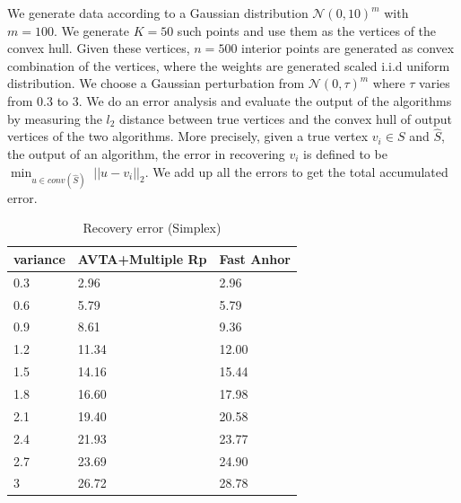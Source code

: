 \documentclass[]{article}
\begin{document}
	\noindent
	 We generate data according to a Gaussian distribution $\mathcal{N}(0,10) ^m$ with $m=100$. We generate $K=50$ such points and use them as the vertices of the convex hull. Given these vertices, $n=500$ interior points are generated as convex combination of the vertices, where the weights are generated  scaled i.i.d uniform distribution. We choose a Gaussian perturbation from $\mathcal{N}(0,\tau) ^m$ where $\tau$ varies from $0.3$ to $3$. 
	We  do an error analysis and evaluate the output of the algorithms by measuring the $l_2$ distance between true vertices and the convex hull of output vertices of the two algorithms.  More precisely, given a true vertex $v_i \in S$ and $\hat{S}$, the output of an algorithm, the error in recovering $v_i$ is defined to be $\min_{u\in conv(\hat{S})} \; ||u-v_i||_2.$ We add up all the errors to get the total accumulated error.
	\begin{table}[!h]
		\centering
		\caption{Recovery error (Simplex)}
		\label{tb:avta rec}
		\begin{tabular}{|l|l|l|}
			\hline
			variance & AVTA+Multiple Rp & Fast Anhor \\ \hline
			0.3      & 2.96             & 2.96       \\ \hline
			0.6      & 5.79             & 5.79       \\ \hline
			0.9      & 8.61             & 9.36       \\ \hline
			1.2      & 11.34            & 12.00      \\ \hline
			1.5      & 14.16            & 15.44      \\ \hline
			1.8      & 16.60            & 17.98      \\ \hline
			2.1      & 19.40            & 20.58      \\ \hline
			2.4      & 21.93            & 23.77      \\ \hline
			2.7      & 23.69            & 24.90      \\ \hline
			3        & 26.72            & 28.78      \\ \hline
		\end{tabular}
	\end{table}
\end{document}
